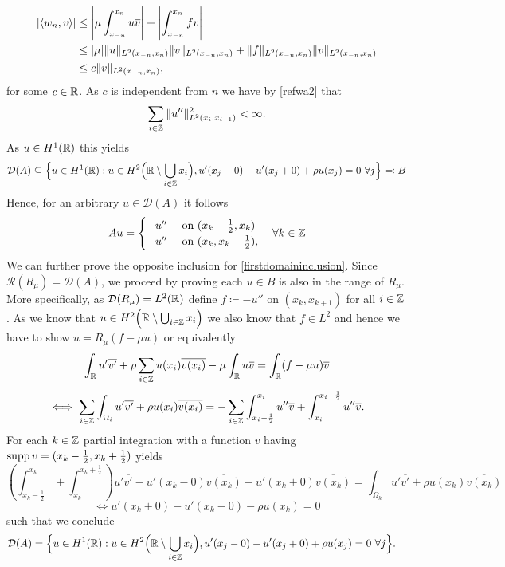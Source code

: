 \begin{align}
	\left| \langle w_{n}, v \rangle \right| & \leq \left| \mu \int_{x_{-n}}^{x_{n}} u \overline{v} \right| + \left| \int_{x_{-n}}^{x_{n}} f v \right| \notag \\
		& \leq |\mu| \|u\|_{L^{2}(x_{-n}, x_{n})} \|v\|_{L^{2}(x_{-n}, x_{n})} + \|f\|_{L^{2}(x_{-n}, x_{n})} \|v\|_{L^{2}(x_{-n}, x_{n})} \notag \\
		& \leq c \|v\|_{L^{2}(x_{-n}, x_{n})}, \label{refwa2}
\end{align}
for some $c \in \mathbb{R}$. As $c$ is independent from $n$ we have by \eqref{refwa2} that
	\[ \sum_{i \in \mathbb{Z}} \|u''\|^{2}_{L^{2}(x_{i}, x_{i+1})} < \infty. \]
As $u \in H^{1}(\mathbb{R})$ this yields
	\[ \mathcal{D}(A) \subseteq \Big\{ u \in H^{1}(\mathbb{R}): u \in H^{2}\Big(\mathbb{R} \setminus \bigcup_{i \in \mathbb{Z}} x_{i} \Big), u'(x_{j} - 0) - u'(x_{j} + 0) + \rho u(x_{j}) = 0 ~\forall j \Big\} \eqqcolon B \label{firstdomaininclusion} \]
Hence, for an arbitrary $u \in \mathcal{D}(A)$ it follows
	\[ A u = \begin{cases}
					- u'' & \text{ on } (x_{k} - \frac{1}{2}, x_{k}) \\
					- u'' & \text{ on } (x_{k}, x_{k} + \frac{1}{2}),
			 \end{cases} \quad \forall k \in \mathbb{Z} \]
We can further prove the opposite inclusion for \eqref{firstdomaininclusion}. Since $\mathcal{R}(R_{\mu}) = \mathcal{D}(A)$, we proceed by proving each $u \in B$ is also in the range of $R_{\mu}$. More specifically, as $\mathcal{D}(R_{\mu}) = L^{2}(\mathbb{R})$ define $f \coloneqq - u''$ on $(x_{k}, x_{k + 1})$ for all $i \in \mathbb{Z}$. As we know that $u \in H^{2}\Big(\mathbb{R} \setminus \bigcup_{i \in \mathbb{Z}} x_{i} \Big)$ we also know that $f \in L^{2}$ and hence we have to show $u = R_{\mu}(f - \mu u)$ or equivalently
	\[ \int_{\mathbb{R}} u' \overline{v'} + \rho \sum_{i \in \mathbb{Z}} u(x_{i}) \overline{v(x_{i})} - \mu \int_{\mathbb{R}} u \overline{v}= \int_{\mathbb{R}}(f-\mu u) \overline{v} \]
	\[ \iff \sum_{i \in \mathbb{Z}} \int_{\Omega_{i}} u' \overline{v'} + \rho u(x_{i}) \overline{v(x_{i})} = - \sum_{i \in \mathbb{Z}} \int_{x_{i} - \frac{1}{2}}^{x_{i}} u'' \overline{v} + \int_{x_{i}}^{x_{i} + \frac{1}{2}} u'' \overline{v}. \]
	For each $k \in \mathbb{Z}$ partial integration with a function $v$ having $\operatorname{supp} v = (x_{k} - \frac{1}{2}, x_{k} + \frac{1}{2})$ yields
	\[ \left( \int_{x_{k} - \frac{1}{2}}^{x_{k}} + \int_{x_{k}}^{x_{k} +\frac{1}{2}} \right) u' \overline{v'} - u'(x_{k}-0) \overline{v(x_{k})}  + u'(x_{k}+0) \overline{v(x_{k})}  = \int_{\Omega_{k}} u' \overline{v'} + \rho u(x_{k}) \overline{v(x_{k})} \]
	\[ \iff u'(x_{k}+0) - u'(x_{k}-0) - \rho u(x_{k}) = 0 \]
	such that we conclude
	\begin{align*}
		\mathcal{D}(A) & = \Big\{ u \in H^{1}(\mathbb{R}): u \in H^{2}\Big(\mathbb{R} \setminus \bigcup_{i \in \mathbb{Z}} x_{i} \Big), u'(x_{j} - 0) - u'(x_{j} + 0) + \rho u(x_{j}) = 0 ~\forall j \Big\}.
	\end{align*}

